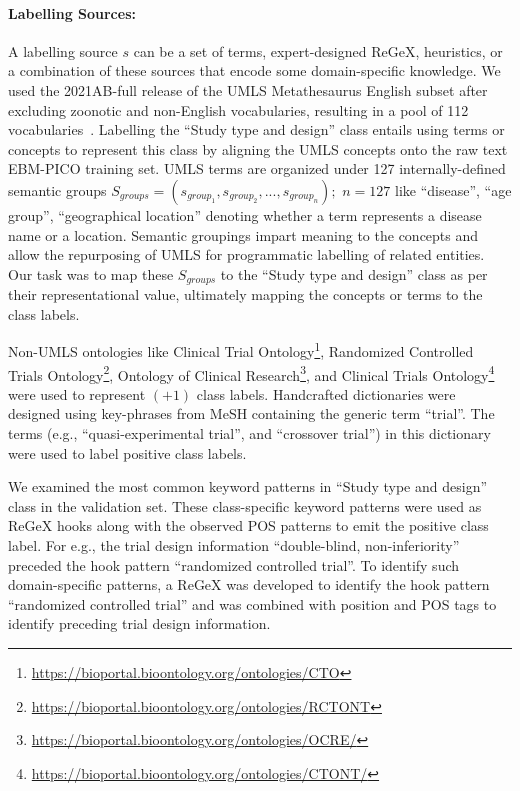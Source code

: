 \documentclass{IOS-Book-Article}
\begin{document}
\paragraph{Labelling Sources:}
%
A labelling source $s$ can be a set of terms, expert-designed ReGeX, heuristics, or a combination of these sources that encode some domain-specific knowledge.
We used the 2021AB-full release of the UMLS Metathesaurus English subset after excluding zoonotic and non-English vocabularies, resulting in a pool of 112 vocabularies~\cite{humphreys1998unified}.
Labelling the ``Study type and design'' class entails using terms or concepts to represent this class by aligning the UMLS concepts onto the raw text EBM-PICO training set.
UMLS terms are organized under 127 internally-defined semantic groups $S_{groups} = (s_{group_{1}}, s_{group_{2}}, ..., s_{group_{n}});$ $n = 127$ like ``disease'', ``age group'', ``geographical location'' denoting whether a term represents a disease name or a location.
Semantic groupings impart meaning to the concepts and allow the repurposing of UMLS for programmatic labelling of related entities.
Our task was to map these $S_{groups}$ to the ``Study type and design'' class as per their representational value, ultimately mapping the concepts or terms to the class labels.



Non-UMLS ontologies like Clinical Trial Ontology\footnote{\url{https://bioportal.bioontology.org/ontologies/CTO}}, Randomized Controlled Trials Ontology\footnote{\url{https://bioportal.bioontology.org/ontologies/RCTONT}}, Ontology of Clinical Research\footnote{\url{https://bioportal.bioontology.org/ontologies/OCRE/}}, and Clinical Trials Ontology\footnote{\url{https://bioportal.bioontology.org/ontologies/CTONT/}} were used to represent $(+1)$ class labels.
Handcrafted dictionaries were designed using key-phrases from MeSH containing the generic term ``trial''.
The terms (e.g., ``quasi-experimental trial'', and ``crossover trial'') in this dictionary were used to label positive class labels.


We examined the most common keyword patterns in ``Study type and design'' class in the validation set.
These class-specific keyword patterns were used as ReGeX hooks along with the observed POS patterns to emit the positive class label.
For e.g., the trial design information ``double-blind, non-inferiority'' preceded the hook pattern ``randomized controlled trial''.
To identify such domain-specific patterns, a ReGeX was developed to identify the hook pattern ``randomized controlled trial'' and was combined with position and POS tags to identify preceding trial design information.
%
%
%
\end{document}
